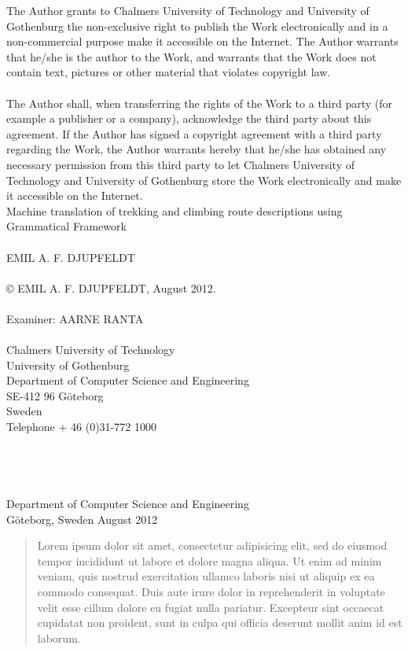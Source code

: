 \pagestyle{empty}
\newpage
\clearpage
The Author grants to Chalmers University of Technology and University of Gothenburg  the non-exclusive right to publish the Work electronically and in a non-commercial purpose make it accessible on the Internet. 
The Author warrants that he/she is the author to the Work, and warrants that the Work does not contain text, pictures or other material that violates copyright law.\\
\\
The Author shall, when transferring the rights of the Work to a third party (for example a publisher or a company), acknowledge the third party about this agreement. If the Author has signed a copyright agreement with a third party regarding the Work, the Author warrants hereby that he/she has obtained any necessary permission from this third party to let Chalmers University of Technology and University of Gothenburg  store the Work electronically and make it accessible on the Internet.\\
\vfill
Machine translation of trekking and climbing route descriptions using Grammatical Framework\\
\\
EMIL A. F. DJUPFELDT\\
\\
© EMIL A. F. DJUPFELDT, August 2012.\\
\\
Examiner: AARNE RANTA\\
\\
Chalmers University of Technology\\
University of Gothenburg\\
Department of Computer Science and Engineering\\
SE-412 96 Göteborg\\
Sweden\\
Telephone + 46 (0)31-772 1000\\
\\
\\
\\
\\
Department of Computer Science and Engineering\\
Göteborg, Sweden August 2012\\

\newpage
\clearpage
\thispagestyle{empty}

\begin{abstract}
Lorem ipsum dolor sit amet, consectetur adipisicing elit, sed do eiusmod tempor incididunt ut labore et dolore magna aliqua. Ut enim ad minim veniam, quis nostrud exercitation ullamco laboris nisi ut aliquip ex ea commodo consequat. Duis aute irure dolor in reprehenderit in voluptate velit esse cillum dolore eu fugiat nulla pariatur. Excepteur sint occaecat cupidatat non proident, sunt in culpa qui officia deserunt mollit anim id est laborum.
\end{abstract}

